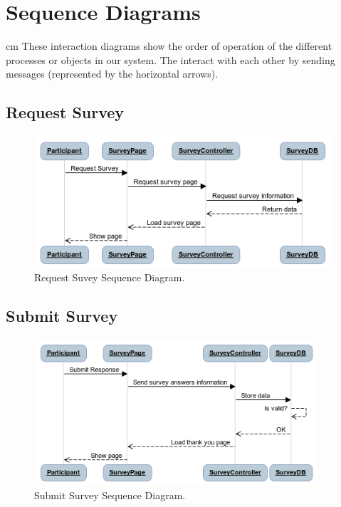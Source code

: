 \documentclass[a4paper,12pt,oneside]{report}
\begin{document}
\section{Sequence Diagrams}
 cm
These interaction diagrams show the order of operation of the different processes or objects in our system. The interact with each other by sending messages (represented by the horizontal arrows).
\vskip 2.5cm
\subsection{Request Survey}
\vskip 1.5cm
\begin{figure}[!hp]
  \begin{center}
   \includegraphics[width=11cm]{pics/request.png}
  \end{center}
\caption{Request Suvey Sequence Diagram.}
\end{figure}
\newpage
\subsection{Submit Survey}
\begin{figure}[!hp]
  \begin{center}
   \includegraphics[width=10.5cm]{pics/submit.png}
  \end{center}
\caption{Submit Survey Sequence Diagram.}
\end{figure}
\vskip 2cm
\end{document}

